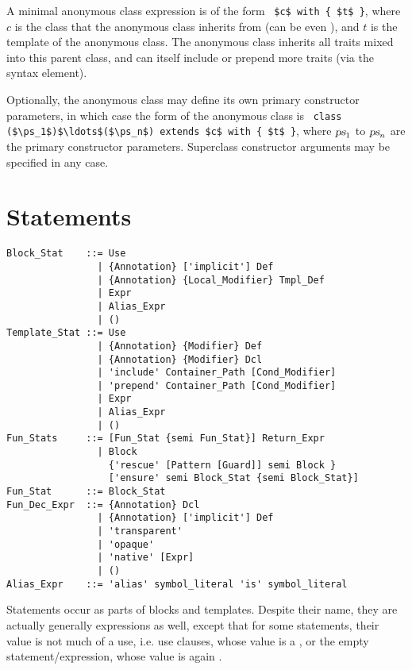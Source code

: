 A minimal anonymous class expression is of the form ~\lstinline!$c$ with { $t$ }!, where $c$ is the class that the anonymous class inherits from (can be even ), and $t$ is the template of the anonymous class. The anonymous class inherits all traits mixed into this parent class, and can itself include or prepend more traits (via the  syntax element). 

Optionally, the anonymous class may define its own primary constructor parameters, in which case the form of the anonymous class is ~\lstinline!class ($\ps_1$)$\ldots$($\ps_n$) extends $c$ with { $t$ }!, where $\mbox{\sl ps}_1$ to $\mbox{\sl ps}_n$ are the primary constructor parameters. Superclass constructor arguments may be specified in any case. 






\section{Statements}
\label{sec:statements}

\syntax\begin{lstlisting}
Block_Stat    ::= Use
                | {Annotation} ['implicit'] Def
                | {Annotation} {Local_Modifier} Tmpl_Def
                | Expr
                | Alias_Expr
                | ()
Template_Stat ::= Use
                | {Annotation} {Modifier} Def
                | {Annotation} {Modifier} Dcl
                | 'include' Container_Path [Cond_Modifier]
                | 'prepend' Container_Path [Cond_Modifier]
                | Expr
                | Alias_Expr
                | ()
Fun_Stats     ::= [Fun_Stat {semi Fun_Stat}] Return_Expr
                | Block
                  {'rescue' [Pattern [Guard]] semi Block }
                  ['ensure' semi Block_Stat {semi Block_Stat}]
Fun_Stat      ::= Block_Stat
Fun_Dec_Expr  ::= {Annotation} Dcl
                | {Annotation} ['implicit'] Def
                | 'transparent'
                | 'opaque'
                | 'native' [Expr]
                | ()
Alias_Expr    ::= 'alias' symbol_literal 'is' symbol_literal
\end{lstlisting}

Statements occur as parts of blocks and templates. Despite their name, they are actually generally expressions as well, except that for some statements, their value is not much of a use, i.e. use clauses, whose value is a , or the empty statement/expression, whose value is again . 


